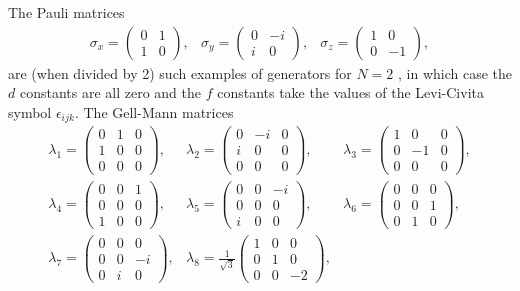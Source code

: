 The Pauli matrices
\[ \begin{array} {ccc}
    \sigma_x= \left( \begin{array} {cc} 0 &1 \\ 1 & 0\end{array} \right), & \sigma_y= \left( \begin{array} {cc} 0 &-i \\ i & 0\end{array} \right) , & \sigma_z=  \left( \begin{array} {cc} 1 &0 \\ 0 & -1 \end{array} \right),\end{array} \]
are (when divided by 2) such examples of generators for $N=2$ , in which case the $d$ constants are all zero and the $f$ constants take the values of the Levi-Civita symbol $\epsilon_{ijk}$. The Gell-Mann matrices
\[ \begin{array} {ccc}
    \lambda_1 = \left(\begin{array} {ccc}0 & 1 & 0 \\ 1 & 0 & 0 \\ 0 & 0 & 0 \end{array}\right),                    &
    \lambda_2 =\left( \begin{array} {ccc}0 & -i & 0 \\ i & 0 & 0 \\ 0 & 0 & 0 \end{array}\right),                    &
    \lambda_3 = \left(\begin{array} {ccc}1 & 0 & 0 \\ 0 & -1 & 0 \\ 0 & 0 & 0 \end{array}\right),                      \\
    \lambda_4 = \left(\begin{array} {ccc}0 & 0 & 1 \\ 0 & 0 & 0 \\ 1 & 0 & 0 \end{array}\right) ,                   &
    \lambda_5 = \left(\begin{array} {ccc}0 & 0 & -i \\ 0 & 0 & 0 \\ i & 0 & 0 \end{array}\right) ,                   &
    \lambda_6 = \left(\begin{array} {ccc}0 & 0 & 0 \\ 0 & 0 & 1 \\ 0 & 1 & 0 \end{array}\right) ,                     \\
    \lambda_7 = \left(\begin{array} {ccc}0 & 0 & 0 \\ 0 & 0 & -i \\ 0 & i & 0 \end{array}\right) ,                   &
    \lambda_8 = \frac{1}{\sqrt{3}} \left(\begin{array} {ccc}1 & 0 & 0 \\ 0 & 1 & 0 \\ 0 & 0 & -2 \end{array}\right), &
  \end{array} \]

